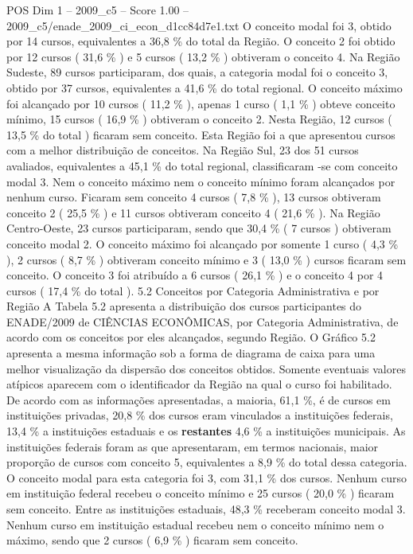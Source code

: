 \begin{textsample}{POS Dim 1 – 2009\_c5 – Score 1.00 – 2009\_c5/enade\_2009\_ci\_econ\_d1cc84d7e1.txt}
O conceito modal foi 3, obtido por 14 cursos, equivalentes a 36,8 \% do total da Região.
O conceito 2 foi obtido por 12 cursos ( 31,6 \% ) e 5 cursos ( 13,2 \% ) obtiveram o conceito 4.
Na Região Sudeste, 89 cursos participaram, dos quais, a categoria modal foi o conceito 3, obtido por 37 cursos, equivalentes a 41,6 \% do total regional.
O conceito máximo foi alcançado por 10 cursos ( 11,2 \% ), apenas 1 curso ( 1,1 \% ) obteve conceito mínimo, 15 cursos ( 16,9 \% ) obtiveram o conceito 2.
Nesta Região, 12 cursos ( 13,5 \% do total ) ficaram sem conceito.
Esta Região foi a que apresentou cursos com a melhor distribuição de conceitos.
Na Região Sul, 23 dos 51 cursos avaliados, equivalentes a 45,1 \% do total regional, classificaram -se com conceito modal 3.
Nem o conceito máximo nem o conceito mínimo foram alcançados por nenhum curso.
Ficaram sem conceito 4 cursos ( 7,8 \% ), 13 cursos obtiveram conceito 2 ( 25,5 \% ) e 11 cursos obtiveram conceito 4 ( 21,6 \% ).
Na Região Centro-Oeste, 23 cursos participaram, sendo que 30,4 \% ( 7 cursos ) obtiveram conceito modal 2.
O conceito máximo foi alcançado por somente 1 curso ( 4,3 \% ), 2 cursos ( 8,7 \% ) obtiveram conceito mínimo e 3 ( 13,0 \% ) cursos ficaram sem conceito.
O conceito 3 foi atribuído a 6 cursos ( 26,1 \% ) e o conceito 4 por 4 cursos ( 17,4 \% do total ). 5.2 Conceitos por Categoria Administrativa e por Região A Tabela 5.2 apresenta a distribuição dos cursos participantes do ENADE/2009 de CIÊNCIAS ECONÔMICAS, por Categoria Administrativa, de acordo com os conceitos por eles alcançados, segundo Região.
O Gráfico 5.2 apresenta a mesma informação sob a forma de diagrama de caixa para uma melhor visualização da dispersão dos conceitos obtidos.
Somente eventuais valores atípicos aparecem com o identificador da Região na qual o curso foi habilitado.
De acordo com as informações apresentadas, a maioria, 61,1 \%, é de cursos em instituições privadas, 20,8 \% dos cursos eram vinculados a instituições federais, 13,4 \% a instituições estaduais e os \textbf{restantes} 4,6 \% a instituições municipais.
As instituições federais foram as que apresentaram, em termos nacionais, maior proporção de cursos com conceito 5, equivalentes a 8,9 \% do total dessa categoria.
O conceito modal para esta categoria foi 3, com 31,1 \% dos cursos.
Nenhum curso em instituição federal recebeu o conceito mínimo e 25 cursos ( 20,0 \% ) ficaram sem conceito.
Entre as instituições estaduais, 48,3 \% receberam conceito modal 3.
Nenhum curso em instituição estadual recebeu nem o conceito mínimo nem o máximo, sendo que 2 cursos ( 6,9 \% ) ficaram sem conceito.

\end{textsample}
